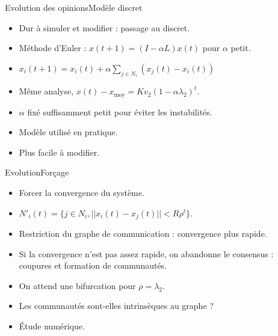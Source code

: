 \documentclass{beamer}
\begin{document}
\begin{frame}{Evolution des opinions}{Modèle discret}
  \begin{itemize}
  \item Dur à simuler et modifier : passage au discret.
  \item Méthode d'Euler : $x(t+1) = (I - \alpha L) x(t)$ pour $\alpha$
    petit.
  \item $x_i(t+1) = x_i(t) + \alpha \sum_{j \in N_i} (x_j(t) - x_i(t))$
  \item Même analyse, $x(t) - x_\text{moy} = K v_2 (1 - \alpha
    \lambda_2)^t$.
  \item $\alpha$ fixé suffisamment petit pour éviter les instabilités.
  \item Modèle utilisé en pratique.
  \item Plus facile à modifier.
  \end{itemize}
\end{frame}

\begin{frame}{Evolution}{Forçage}
  \begin{itemize}
  \item Forcer la convergence du système.
  \item $N'_{i}(t) = \{j \in N_i, ||x_i(t) - x_j(t)|| < R \rho^t\}.$
  \item Restriction du graphe de communication : convergence plus rapide.
  \item Si la convergence n'est pas assez rapide, on abandonne le
    consensus : coupures et formation de communautés.
  \item On attend une bifurcation pour $\rho = \lambda_2$.
  \item Les communautés sont-elles intrinsèques au graphe ?
  \item Étude numérique.
  \end{itemize}
\end{frame}
\end{document}
